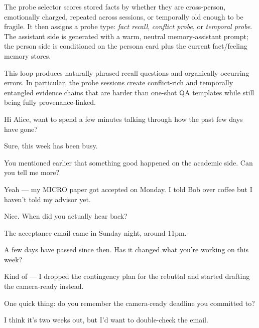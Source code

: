 The probe selector scores stored facts by whether they are cross-person, emotionally charged, repeated across sessions, or temporally old enough to be fragile.
It then assigns a probe type:
\emph{fact recall}, \emph{conflict probe}, or \emph{temporal probe}.
The assistant side is generated with a warm, neutral memory-assistant prompt; the person side is conditioned on the persona card plus the current fact/feeling memory stores.

This loop produces naturally phrased recall questions and organically occurring errors.
In particular, the probe sessions create conflict-rich and temporally entangled evidence chains that are harder than one-shot QA templates while still being fully provenance-linked.


{\small
\begin{description}
\setlength{\itemsep}{2pt}
\item[Agent:] Hi Alice, want to spend a few minutes talking through how the past few days have gone?
\item[Alice:] Sure, this week has been busy.
\item[Agent:] You mentioned earlier that something good happened on the academic side. Can you tell me more?
\item[Alice:] Yeah --- my MICRO paper got accepted on Monday. I told Bob over coffee but I haven't told my advisor yet.
\item[Agent:] Nice. When did you actually hear back?
\item[Alice:] The acceptance email came in Sunday night, around 11pm.
\item[Agent:] A few days have passed since then. Has it changed what you're working on this week?
\item[Alice:] Kind of --- I dropped the contingency plan for the rebuttal and started drafting the camera-ready instead.
\item[Agent:] One quick thing: do you remember the camera-ready deadline you committed to?
\item[Alice:] I think it's two weeks out, but I'd want to double-check the email.
\end{description}
}

